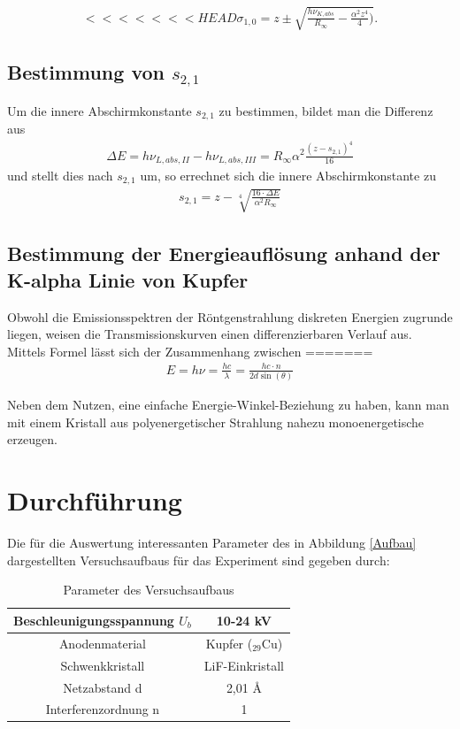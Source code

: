 \begin{align}
<<<<<<< HEAD
\sigma_{1,0}=z\pm\sqrt{\frac{h\nu_{K,abs}}{R_\infty}-\frac{\alpha^2z^4}{4})}.
\end{align}

\subsection{Bestimmung von $s_{2,1}$}
Um die innere Abschirmkonstante $s_{2,1}$ zu bestimmen, bildet man die Differenz aus %
\begin{align}
\Delta E = h\nu_{L,abs,II}-h\nu_{L,abs,III} = R_\infty\alpha^2\frac{(z-s_{2,1})^4}{16}
\end{align}
und stellt dies nach $s_{2,1}$ um, so errechnet sich die innere Abschirmkonstante zu
\begin{align}
s_{2,1} = z-\sqrt[4]{\frac{16\cdot\Delta E}{\alpha^2 R_\infty}}
\end{align}

\subsection{Bestimmung der Energieauflösung anhand der K-alpha Linie von Kupfer}
Obwohl die Emissionsspektren der Röntgenstrahlung diskreten Energien zugrunde liegen, weisen die Transmissionskurven einen differenzierbaren Verlauf aus. Mittels Formel %
 lässt sich der Zusammenhang zwischen 
=======
\begin{align}
E = h\nu = \frac{h c}{\lambda} = \frac{h c\cdot n}{2d\sin(\theta)}
\label{Bragg}
\end{align}

Neben dem Nutzen, eine einfache Energie-Winkel-Beziehung zu haben, kann man mit einem Kristall aus polyenergetischer
Strahlung nahezu monoenergetische erzeugen.

\section{Durchführung}
Die für die Auswertung interessanten Parameter des in Abbildung \ref{Aufbau} dargestellten Versuchsaufbaus für das Experiment
sind gegeben durch:

\renewcommand{\arraystretch}{1.5}
\begin{table}[H]
 \begin{tabular}{|c|c|}
\hline
Beschleunigungsspannung $U_b$ & 10-24 kV\\
\hline
Anodenmaterial & Kupfer ($_{29}$Cu)\\
\hline
Schwenkkristall & LiF-Einkristall\\
\hline
Netzabstand d  & 2,01 \AA \\
\hline
Interferenzordnung n & 1\\
\hline
\end{tabular}
\caption{Parameter des Versuchsaufbaus}
\end{table}
\renewcommand{\arraystretch}{1}

